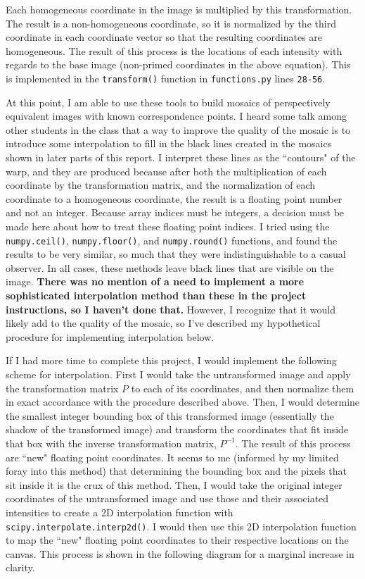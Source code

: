 \documentclass[]{article}
\begin{document}
Each homogeneous coordinate in the image is multiplied by this transformation. The result is a non-homogeneous coordinate, so it is normalized by the third coordinate in each coordinate vector so that the resulting coordinates are homogeneous. The result of this process is the locations of each intensity with regards to the base image (non-primed coordinates in the above equation). This is implemented in the \texttt{transform()} function in \texttt{functions.py} lines \texttt{28-56}. 

At this point, I am able to use these tools to build mosaics of perspectively equivalent images with known correspondence points. I heard some talk among other students in the class that a way to improve the quality of the mosaic is to introduce some interpolation to fill in the black lines created in the mosaics shown in later parts of this report. I interpret these lines as the ``contours" of the warp, and they are produced because after both the multiplication of each coordinate by the transformation matrix, and the normalization of each coordinate to a homogeneous coordinate, the result is a floating point number and not an integer. Because array indices must be integers, a decision must be made here about how to treat these floating point indices. I tried using the \texttt{numpy.ceil()}, \texttt{numpy.floor()}, and \texttt{numpy.round()} functions, and found the results to be very similar, so much that they were indistinguishable to a casual observer. In all cases, these methods leave black lines that are visible on the image. \textbf{There was no mention of a need to implement a more sophisticated interpolation method than these in the project instructions, so I haven't done that.} However, I recognize that it would likely add to the quality of the mosaic, so I've described my hypothetical procedure for implementing interpolation below.

If I had more time to complete this project, I would implement the following scheme for interpolation. First I would take the untransformed image and apply the transformation matrix $P$ to each of its coordinates, and then normalize them in exact accordance with the procedure described above. Then, I would determine the smallest integer bounding box of this transformed image (essentially the shadow of the transformed image) and transform the coordinates that fit inside that box with the inverse transformation matrix, $P^{-1}$. The result of this process are ``new" floating point coordinates. It seems to me (informed by my limited foray into this method) that determining the bounding box and the pixels that sit inside it is the crux of this method. Then, I would take the original integer coordinates of the untransformed image and use those and their associated intensities to create a 2D interpolation function with \texttt{scipy.interpolate.interp2d()}. I would then use this 2D interpolation function to map the ``new" floating point coordinates to their respective locations on the canvas. This process is shown in the following diagram for a marginal increase in clarity. 
\end{document}
